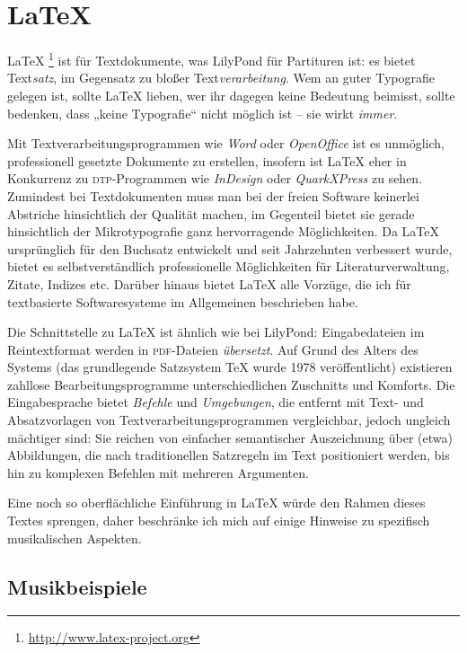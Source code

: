 \documentclass[DIV=12]{scrreprt}
\begin{document}
\chapter{\LaTeX}
\label{chap:pt_latex}

\LaTeX%
\footnote{\url{http://www.latex-project.org}}
ist für Textdokumente, was LilyPond für Partituren ist:
es bietet Text\emph{satz}, im Gegensatz zu bloßer Text\emph{verarbeitung}.
Wem an guter Typografie gelegen ist, sollte \LaTeX{} lieben, wer ihr dagegen keine Bedeutung beimisst, sollte bedenken, dass „keine Typografie“ nicht möglich ist -- sie wirkt \emph{immer}. 

Mit Textverarbeitungsprogrammen wie \emph{Word} oder \emph{OpenOffice} ist es unmöglich, professionell gesetzte Dokumente zu erstellen, insofern ist \LaTeX{} eher in Konkurrenz zu \textsc{dtp}-Programmen wie \emph{InDesign} oder \emph{QuarkXPress} zu sehen.
Zumindest bei Textdokumenten muss man bei der freien Software keinerlei Abstriche hinsichtlich der Qualität machen, im Gegenteil bietet sie gerade hinsichtlich der Mikrotypografie ganz hervorragende Möglichkeiten.
Da \LaTeX{} ursprünglich für den Buchsatz entwickelt und seit Jahrzehnten verbessert wurde, bietet es selbstverständlich professionelle Möglichkeiten für Literaturverwaltung, Zitate, Indizes etc.
Darüber hinaus bietet \LaTeX{} alle Vorzüge, die ich für textbasierte Softwaresysteme im Allgemeinen beschrieben habe.

Die Schnittstelle zu \LaTeX{} ist ähnlich wie bei LilyPond:
Eingabedateien im Reintextformat werden in \textsc{pdf}-Dateien \emph{übersetzt}.
Auf Grund des Alters des Systems (das grundlegende Satzsystem \TeX{} wurde 1978 veröffentlicht) existieren zahllose Bearbeitungsprogramme unterschiedlichen Zuschnitts und Komforts.
Die Eingabesprache bietet \emph{Befehle} und \emph{Umgebungen}, die entfernt mit Text- und Absatzvorlagen von Textverarbeitungsprogrammen vergleichbar, jedoch ungleich mächtiger sind:
Sie reichen von einfacher semantischer Auszeichnung über (etwa) Abbildungen, die nach traditionellen Satzregeln im Text positioniert werden, bis hin zu komplexen Befehlen mit mehreren Argumenten.

Eine noch so oberflächliche Einführung in \LaTeX{} würde den Rahmen dieses Textes sprengen, daher beschränke ich mich auf einige Hinweise zu spezifisch musikalischen Aspekten.


\section{Musikbeispiele}
\label{sec:pt_music-examples}
\end{document}

